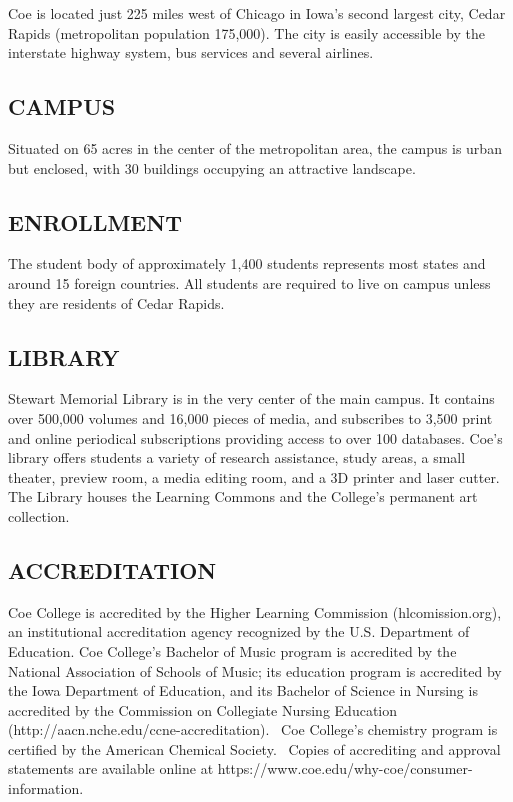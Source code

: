 \documentclass[
  letterpaper,
]{scrbook}
\begin{document}
Coe is located just 225 miles west of Chicago in Iowa's second largest
city, Cedar Rapids (metropolitan population 175,000). The city is easily
accessible by the interstate highway system, bus services and several
airlines.

\subsection{CAMPUS}\label{campus}

Situated on 65 acres in the center of the metropolitan area, the campus
is urban but enclosed, with 30 buildings occupying an attractive
landscape.

\subsection{ENROLLMENT}\label{enrollment}

The student body of approximately 1,400 students represents most states
and around 15 foreign countries. All students are required to live on
campus unless they are residents of Cedar Rapids.

\subsection{LIBRARY}\label{library}

Stewart Memorial Library is in the very center of the main campus. It
contains over 500,000 volumes and 16,000 pieces of media, and subscribes
to 3,500 print and online periodical subscriptions providing access to
over 100 databases. Coe's library offers students a variety of research
assistance, study areas, a small theater, preview room, a media editing
room, and a 3D printer and laser cutter. The Library houses the Learning
Commons and the College's permanent art collection.

\subsection{ACCREDITATION}\label{accreditation}

Coe College is accredited by the Higher Learning Commission
(hlcomission.org), an institutional accreditation agency recognized by
the U.S. Department of Education. Coe College's Bachelor of Music
program is accredited by the National Association of Schools of Music;
its education program is accredited by the Iowa Department of Education,
and its Bachelor of Science in Nursing is accredited by the Commission
on Collegiate Nursing Education
(http://aacn.nche.edu/ccne-accreditation).~ Coe College's chemistry
program is certified by the American Chemical Society.~ Copies of
accrediting and approval statements are available online at
https://www.coe.edu/why-coe/consumer-information.
\end{document}
